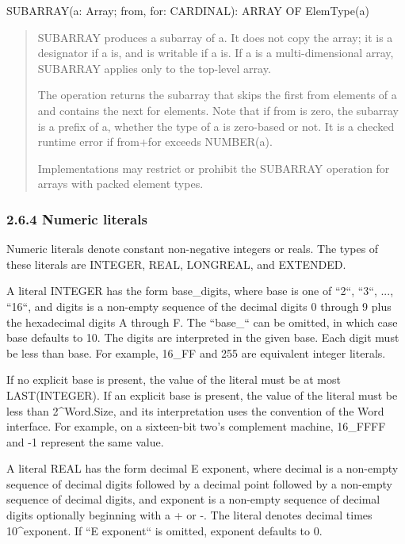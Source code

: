 \documentclass[10pt]{article}
\begin{document}
  SUBARRAY(a: Array; from, for: CARDINAL): ARRAY OF ElemType(a) 
\begin{quote}
SUBARRAY produces a subarray of a. It does not copy the array; it is a designator if a is, and is writable if a is. If a is a multi-dimensional array, SUBARRAY applies only to the top-level array. 

 The operation returns the subarray that skips the first from elements of a and contains the next for elements. Note that if from is zero, the subarray is a prefix of a, whether the type of a is zero-based or not. It is a checked runtime error if from+for exceeds NUMBER(a). 


 Implementations may restrict or prohibit the SUBARRAY operation for arrays with packed element types. 
\end{quote}



 
\subsubsection*{2.6.4 Numeric literals}


  Numeric literals denote constant non-negative integers or reals. The types of these literals are INTEGER, REAL, LONGREAL, and EXTENDED. 


  A literal INTEGER has the form base\_digits, where base is one of ``2``, ``3``, ..., ``16``, and digits is a non-empty sequence of the decimal digits 0 through 9 plus the hexadecimal digits A through F. The ``base\_`` can be omitted, in which case base defaults to 10. The digits are interpreted in the given base. Each digit must be less than base. For example, 16\_FF and 255 are equivalent integer literals. 


  If no explicit base is present, the value of the literal must be at most LAST(INTEGER). If an explicit base is present, the value of the literal must be less than 2\^{}Word.Size, and its interpretation uses the convention of the Word interface. For example, on a sixteen-bit two's complement machine, 16\_FFFF and -1 represent the same value. 


 A literal REAL has the form decimal E exponent, where decimal is a non-empty sequence of decimal digits followed by a decimal point followed by a non-empty sequence of decimal digits, and exponent is a non-empty sequence of decimal digits optionally beginning with a + or -. The literal denotes decimal times 10\^{}exponent. If ``E exponent`` is omitted, exponent defaults to 0. 
\end{document}
